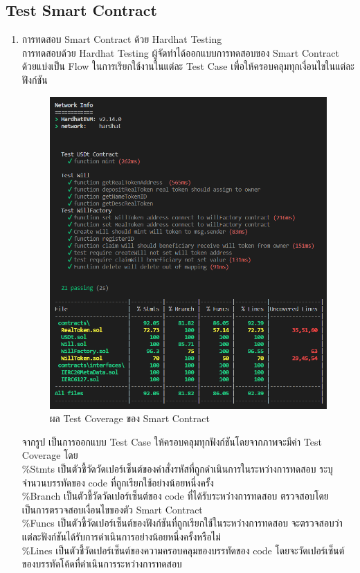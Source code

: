\documentclass[12pt,oneside,openright,a4paper]{cpe-thai-project}
\begin{document}
\subsection {Test Smart Contract}
\begin{enumerate}[label=\thesubsection.\arabic*,leftmargin=0pt,itemindent=1.25cm]
\item การทดสอบ Smart Contract ด้วย Hardhat Testing \\
	\tab\tab การทดสอบด้วย Hardhat Testing ผู้จัดทำได้ออกแบบการทดสอบของ Smart Contract ด้วยแบ่งเป็น Flow ในการเรียกใช้งานในแต่ละ Test Case เพื่อให้ครอบคลุมทุกเงื่อนไขในแต่ละฟังก์ชัน
\begin{figure}[!thb]
			\centering
			\includegraphics[scale=0.5]{testCoverage}
			\caption{ผล Test Coverage ของ Smart Contract}
		\end{figure}
\FloatBarrier
\tab จากรูป เป็นการออกแบบ Test Case ให้ครอบคลุมทุกฟังก์ชันโดยจากภาพจะมีค่า Test Coverage โดย \\ \tab\%Stmts เป็นตัวชี้วัดวัดเปอร์เซ็นต์ของคำสั่งรหัสที่ถูกดำเนินการในระหว่างการทดสอบ ระบุจำนวนบรรทัดของ code ที่ถูกเรียกใช้อย่างน้อยหนึ่งครั้ง \\ \tab\%Branch เป็นตัวชี้วัดวัดเปอร์เซ็นต์ของ code ที่ได้รับระหว่างการทดสอบ ตรวจสอบโดยเป็นการตรวจสอบเงื่อนไขของตัว Smart Contract  \\ \tab\%Funcs เป็นตัวชี้วัดเปอร์เซ็นต์ของฟังก์ชันที่ถูกเรียกใช้ในระหว่างการทดสอบ จะตรวจสอบว่าแต่ละฟังก์ชันได้รับการดำเนินการอย่างน้อยหนึ่งครั้งหรือไม่  \\\tab\%Lines เป็นตัวชี้วัดเปอร์เซ็นต์ของความครอบคลุมของบรรทัดของ code โดยจะวัดเปอร์เซ็นต์ของบรรทัดโค้ดที่ดำเนินการระหว่างการทดสอบ
\end{enumerate}
\end{document}
